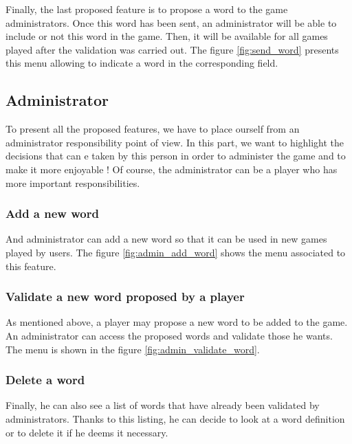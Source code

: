 \documentclass{tnreport}
\begin{document}
Finally, the last proposed feature is to propose a word to the game administrators. Once this word has been sent, an administrator will be able to include or not this word in the game. Then, it will be available for all games played after the validation was carried out. The figure \ref{fig:send_word} presents this menu allowing to indicate a word in the corresponding field. 

\subsection{Administrator}

To present all the proposed features, we have to place ourself from an administrator responsibility point of view. In this part, we want to highlight the decisions that can e taken by this person in order to administer the game and to make it more enjoyable ! Of course, the administrator can be a player who has more important responsibilities. 

\subsubsection{Add a new word}

And administrator can add a new word so that it can be used in new games played by users. The figure \ref{fig:admin_add_word} shows the menu associated to this feature. 

\subsubsection{Validate a new word proposed by a player}

As mentioned above, a player may propose a new word to be added to the game. An administrator can access the proposed words and validate those he wants. The menu is shown in the figure \ref{fig:admin_validate_word}. 

\subsubsection{Delete a word}

Finally, he can also see a list of words that have already been validated by administrators. Thanks to this listing, he can decide to look at a word definition or to delete it if he deems it necessary. 

\bigskip
\end{document}
